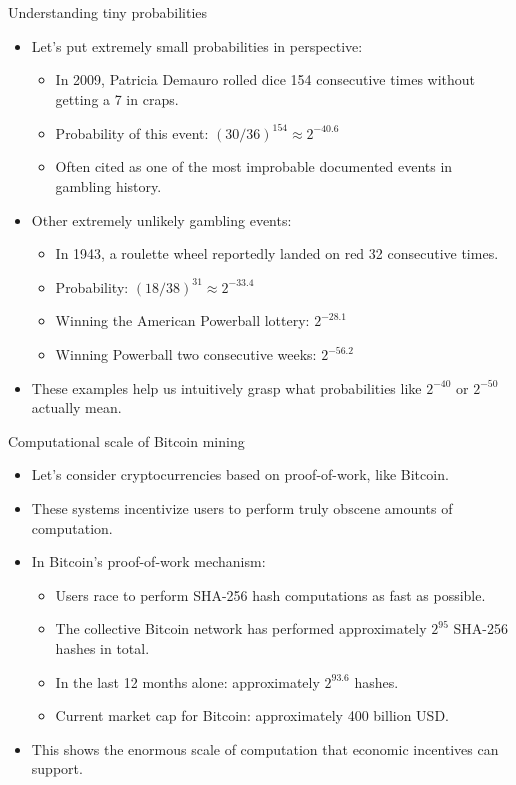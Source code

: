 \documentclass[aspectratio=169, lualatex, handout]{beamer}
\begin{document}
\begin{frame}{Understanding tiny probabilities}
	\begin{itemize}
		\item Let's put extremely small probabilities in perspective:
		      \begin{itemize}
			      \item In 2009, Patricia Demauro rolled dice 154 consecutive times without getting a 7 in craps.
			      \item Probability of this event: $(30/36)^{154} \approx 2^{-40.6}$
			      \item Often cited as one of the most improbable documented events in gambling history.
		      \end{itemize}
		\item Other extremely unlikely gambling events:
		      \begin{itemize}
			      \item In 1943, a roulette wheel reportedly landed on red 32 consecutive times.
			      \item Probability: $(18/38)^{31} \approx 2^{-33.4}$
			      \item Winning the American Powerball lottery: $2^{-28.1}$
			      \item Winning Powerball two consecutive weeks: $2^{-56.2}$
		      \end{itemize}
		\item These examples help us intuitively grasp what probabilities like $2^{-40}$ or $2^{-50}$ actually mean.
	\end{itemize}
\end{frame}

\begin{frame}{Computational scale of Bitcoin mining}
	\begin{itemize}[<+->]
		\item Let's consider cryptocurrencies based on proof-of-work, like Bitcoin.
		\item These systems incentivize users to perform truly obscene amounts of computation.
		\item In Bitcoin's proof-of-work mechanism:
		      \begin{itemize}
			      \item Users race to perform SHA-256 hash computations as fast as possible.
			      \item The collective Bitcoin network has performed approximately $2^{95}$ SHA-256 hashes in total.
			      \item In the last 12 months alone: approximately $2^{93.6}$ hashes.
			      \item Current market cap for Bitcoin: approximately 400 billion USD.
		      \end{itemize}
		\item This shows the enormous scale of computation that economic incentives can support.
	\end{itemize}
\end{frame}
\end{document}
